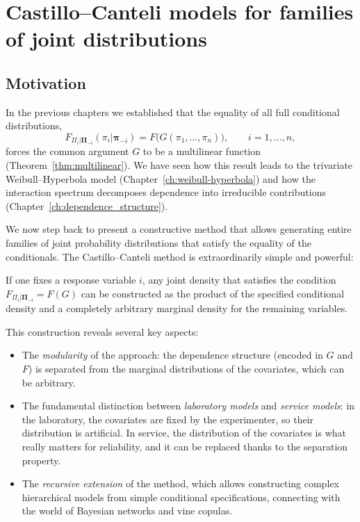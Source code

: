 \startcontents[chapter]
\chapter{Castillo–Canteli models for families of joint distributions}
\label{ch:castillo-canteli}
\minitocboxed

\section*{Motivation}

In the previous chapters we established that the equality of all full conditional distributions,
\[
F_{\Pi_i|\boldsymbol{\Pi}_{-i}}(\pi_i|\boldsymbol{\pi}_{-i}) = F\bigl(G(\pi_1,\ldots,\pi_n)\bigr),\qquad i=1,\ldots,n,
\]
forces the common argument \(G\) to be a multilinear function (Theorem~\ref{thm:multilinear}). We have seen how this result leads to the trivariate Weibull–Hyperbola model (Chapter~\ref{ch:weibull-hyperbola}) and how the interaction spectrum decomposes dependence into irreducible contributions (Chapter~\ref{ch:dependence_structure}).

We now step back to present a constructive method that allows generating entire families of joint probability distributions that satisfy the equality of the conditionals. The Castillo–Canteli method is extraordinarily simple and powerful:

If one fixes a response variable \(i\), any joint density that satisfies the condition \(F_{\Pi_i|\boldsymbol{\Pi}_{-i}} = F(G)\) can be constructed as the product of the specified conditional density and a completely arbitrary marginal density for the remaining variables.

This construction reveals several key aspects:

\begin{itemize}
    \item The \emph{modularity} of the approach: the dependence structure (encoded in \(G\) and \(F\)) is separated from the marginal distributions of the covariates, which can be arbitrary.
    \item The fundamental distinction between \emph{laboratory models} and \emph{service models}: in the laboratory, the covariates are fixed by the experimenter, so their distribution is artificial. In service, the distribution of the covariates is what really matters for reliability, and it can be replaced thanks to the separation property.
    \item The \emph{recursive extension} of the method, which allows constructing complex hierarchical models from simple conditional specifications, connecting with the world of Bayesian networks and vine copulas.
\end{itemize}

